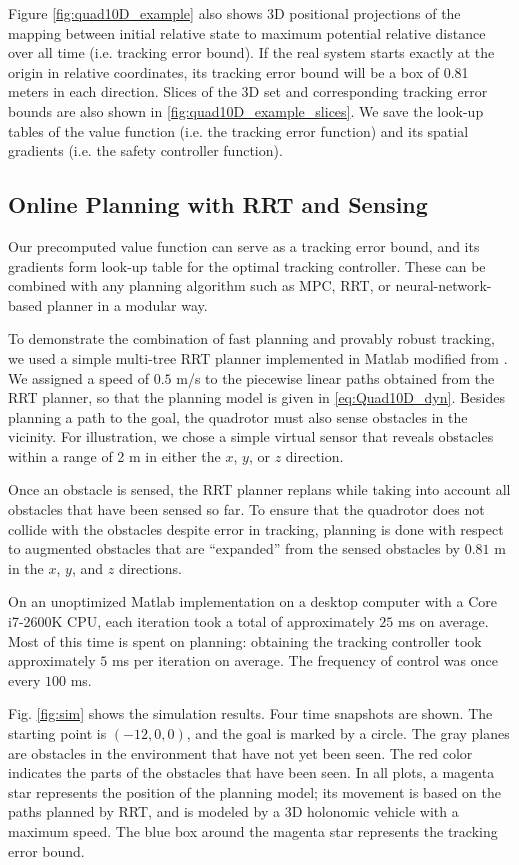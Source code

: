Figure \ref{fig:quad10D_example} also shows 3D positional projections of the mapping between initial relative state to maximum potential relative distance over all time (i.e. tracking error bound). If the real system starts exactly at the origin in relative coordinates, its tracking error bound will be a box of 0.81 meters in each direction. Slices of the 3D set and corresponding tracking error bounds are also shown in \ref{fig:quad10D_example_slices}. We save the look-up tables of the value function (i.e. the tracking error function) and its spatial gradients (i.e. the safety controller function).

\subsection{Online Planning with RRT and Sensing}
Our precomputed value function can serve as a tracking error bound, and its gradients form look-up table for the optimal tracking controller. These can be combined with any planning algorithm such as MPC, RRT, or neural-network-based planner in a modular way. 

To demonstrate the combination of fast planning and provably robust tracking, we used a simple multi-tree RRT planner implemented in Matlab modified from \cite{Gavin2013}. We assigned a speed of $0.5$ m/s to the piecewise linear paths obtained from the RRT planner, so that the planning model is given in \eqref{eq:Quad10D_dyn}. Besides planning a path to the goal, the quadrotor must also sense obstacles in the vicinity. For illustration, we chose a simple virtual sensor that reveals obstacles within a range of 2 m in either the $x$, $y$, or $z$ direction.

Once an obstacle is sensed, the RRT planner replans while taking into account all obstacles that have been sensed so far. To ensure that the quadrotor does not collide with the obstacles despite error in tracking, planning is done with respect to augmented obstacles that are ``expanded'' from the sensed obstacles by $0.81$ m in the $x$, $y$, and $z$ directions.

On an unoptimized Matlab implementation on a desktop computer with a Core i7-2600K CPU, each iteration took a total of approximately $25$ ms on average. Most of this time is spent on planning: obtaining the tracking controller took approximately $5$ ms per iteration on average. The frequency of control was once every $100$ ms.

Fig. \ref{fig:sim} shows the simulation results. Four time snapshots are shown. The starting point is $(-12, 0, 0)$, and the goal is marked by a circle. The gray planes are obstacles in the environment that have not yet been seen. The red color indicates the parts of the obstacles that have been seen. In all plots, a magenta star represents the position of the planning model; its movement is based on the paths planned by RRT, and is modeled by a 3D holonomic vehicle with a maximum speed. The blue box around the magenta star represents the tracking error bound.

